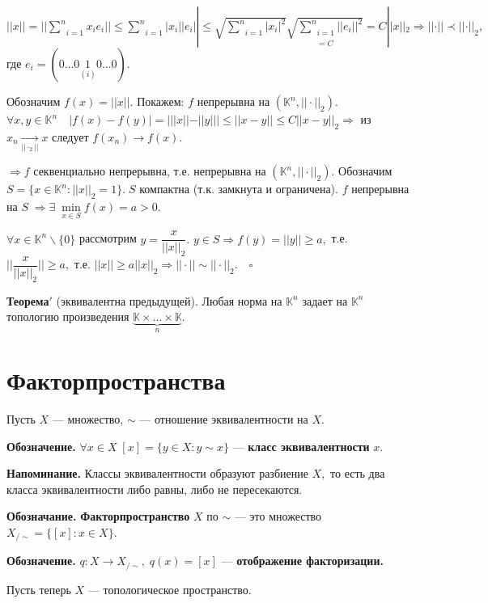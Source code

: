 \documentclass[12pt,a4paper]{article}
\begin{document}
$||x|| = ||\underset{i = 1}{\overset{n}{\sum}} x_{i}e_{i}|| \leq \underset{i = 1}{\overset{n}{\sum}} |x_{i}||e_{i}|| \leq \sqrt{\underset{i = 1}{\overset{n}{\sum}}|x_{i}|^{2}} \underset{= C}{\sqrt{\underset{i = 1}{\overset{n}{\sum}}||e_{i}||^{2}}} = C||x||_{2} \Rightarrow ||\cdot|| \prec ||\cdot||_{2},$ где $e_{i} = (0...0\underset{(i)}{1}0...0).$

Обозначим $f(x) = ||x||.$ Покажем: $f$ непрерывна на $(\mathbb{K}^{n}, ||\cdot||_{2}).$ $\forall x, y \in \mathbb{K}^{n} \quad |f(x) - f(y)| = |||x|| - ||y||| \leq ||x - y|| \leq C||x - y||_{2} \Rightarrow$ из $x_{n} \underset{||\cdot_{2}||}{\to} x$ следует $f(x_{n}) \to f(x).$

$\Rightarrow f$ секвенциально непрерывна, т.е. непрерывна на $(\mathbb{K}^{n}, ||\cdot||_{2}).$ Обозначим $S = \{x \in \mathbb{K}^{n}\!: ||x||_{2} = 1\}. \; S$ компактна (т.к. замкнута и ограничена). $f$ непрерывна на $S \; \Rightarrow \exists \; \underset{x \in S}{\min} f(x) = a > 0.$
	
$\forall x \in \mathbb{K}^{n} \backslash \{0\}$ рассмотрим $y = \dfrac{x}{||x||_{2}}.$ $y \in S \Rightarrow f(y) = ||y|| \geq a,$ т.е. $||\dfrac{x}{||x||_{2}}|| \geq a,$ т.е. $||x|| \geq a ||x||_{2} \Rightarrow ||\cdot|| \sim ||\cdot||_{2}. \quad \square$

\textbf{Теорема$'$} (эквивалентна предыдущей). Любая норма на $\mathbb{K}^{n}$ задает на $\mathbb{K}^{n}$ топологию произведения $\underbrace{\mathbb{K} \times ... \times \mathbb{K}}_{n}.$

\section{Факторпространства}

Пусть $X$ --- множество, $\sim$ --- отношение эквивалентности на $X.$ 

\textbf{Обозначение.} $\forall x \in X \; [x] = \{y \in X\!: y \sim x\}$ --- \textbf{класс эквивалентности} $x.$

\textbf{Напоминание.} Классы эквивалентности образуют разбиение $X,$ то есть два класса эквивалентности либо равны, либо не пересекаются. 

\textbf{Обозначание.} \textbf{Факторпространство} $X$ по $\sim$ --- это множество $X_{/ \sim} = \{[x]\!: x \in X\}.$

\textbf{Обозначение.} $q\!: X \to X_{/ \sim}, \; q(x) = [x]$ --- \textbf{отображение факторизации.}

Пусть теперь $X$ --- топологическое пространство.
\end{document}
